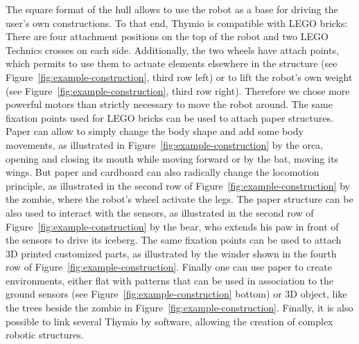 \documentclass[letterpaper, 10 pt, conference]{ieeeconf}  %
\begin{document}
The square format of the hull allows to use the robot as a base for driving the user's own constructions.
To that end, Thymio is compatible with LEGO bricks:
There are four attachment positions on the top of the robot and two LEGO Technics crosses on each side.
Additionally, the two wheels have attach points, which permits to use them to actuate elements elsewhere in the structure (see Figure~\ref{fig:example-construction}, third row left) or to lift the robot's own weight (see Figure~\ref{fig:example-construction}, third row right).
Therefore we chose more powerful motors than strictly necessary to move the robot around.
The same fixation points used for LEGO bricks can be used to attach paper structures.
Paper can allow to simply change the body shape and add some body movements, as illustrated in Figure~\ref{fig:example-construction} by the orca, opening and closing its mouth while moving forward or by the bat, moving its wings. 
But paper and cardboard can also radically change the locomotion principle, as illustrated in the second row of Figure~\ref{fig:example-construction} by the zombie, where the robot's wheel activate the legs. 
The paper structure can be also used to interact with the sensors, as illustrated in the second row of Figure~\ref{fig:example-construction} by the bear, who extends his paw in front of the sensors to drive its iceberg.
The same fixation points can be used to attach 3D printed customized parts, as illustrated by the winder shown in the fourth row of Figure~\ref{fig:example-construction}.
Finally one can use paper to create environments, either flat with patterns that can be used in association to the ground sensors (see Figure~\ref{fig:example-construction} bottom) or 3D object, like the trees beside the zombie in Figure~\ref{fig:example-construction}.
Finally, it is also possible to link several Thymio by software, allowing the creation of complex robotic structures.
\end{document}
